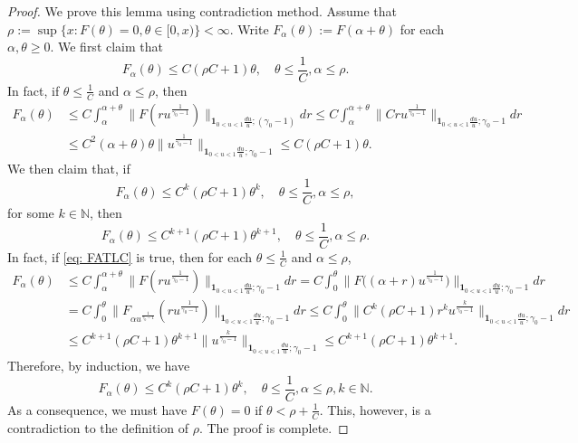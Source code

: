 \documentclass[12pt, a4paper]{amsart}
\theoremstyle{definition}
\numberwithin{equation}{section}
\begin{document}
\begin{proof}
We prove this lemma using contradiction method.
	Assume that $\rho :=  \sup\{x: F(\theta) = 0, \theta \in [0,x)\} < \infty$.
	Write $F_\alpha (\theta) := F(\alpha + \theta)$ for each $\alpha, \theta \geq 0$.
	We first claim that
\[
	F_\alpha (\theta)
	\leq C(\rho C + 1) \theta,
	\quad \theta \leq \frac{1}{C}, \alpha \leq \rho.
\]
	In fact, if $\theta \leq \frac{1}{C}$ and $\alpha \leq \rho$, then
\[\begin{split}
	F_\alpha (\theta)
	&\leq C\int_\alpha^{\alpha + \theta} \|F(ru^{\frac{1}{\gamma_0 - 1}}) \|_{\mathbf 1_{0<u<1}\frac{du}{u}; (\gamma_0 - 1)} dr
	\leq C\int_\alpha^{\alpha + \theta} \|Cru^{\frac{1}{\gamma_0 - 1}} \|_{\mathbf 1_{0<u<1}\frac{du}{u}; \gamma_0 - 1} dr
	\\&\leq C^2 (\alpha + \theta) \theta \|u^{\frac{1}{\gamma_0 - 1}} \|_{\mathbf 1_{0<u<1}\frac{du}{u}; \gamma_0 - 1}
	\leq C(\rho C + 1) \theta.
\end{split}\]
	We then claim that, if
\[\label{eq: FATLC}
	F_\alpha (\theta)
	\leq C^k(\rho C + 1) \theta^k,
	\quad \theta \leq \frac{1}{C}, \alpha \leq \rho,
\]
	for some $k \in \mathbb N$, then
\[
	F_\alpha (\theta)
	\leq C^{k+1}(\rho C + 1) \theta^{k+1},
	\quad \theta \leq \frac{1}{C}, \alpha \leq \rho.
	\]
	In fact, if \eqref{eq: FATLC} is true, then for each $\theta \leq \frac{1}{C}$ and $\alpha \leq \rho$,
\[\begin{split}
	F_\alpha (\theta)
	&\leq C\int_\alpha^{\alpha + \theta} \|F(ru^{\frac{1}{\gamma_0 - 1}}) \|_{\mathbf 1_{0<u<1}\frac{du}{u}; \gamma_0 - 1} dr
	=  C\int_0^\theta \big \|F\big( (\alpha + r)u^{\frac{1}{\gamma_0 - 1}} \big ) \big \|_{\mathbf 1_{0<u<1}\frac{du}{u}; \gamma_0 - 1} dr
	\\& =  C\int_0^\theta \|F_{\alpha u^{\frac{1}{\gamma_0 - 1}}}( ru^{\frac{1}{\gamma_0 - 1}}) \|_{\mathbf 1_{0<u<1}\frac{du}{u}; \gamma_0 - 1} dr
	\leq C\int_0^ \theta \|C^k (\rho C+ 1) r^k u^{\frac{k}{\gamma_0 - 1} } \|_{\mathbf 1_{0<u<1}\frac{du}{u}; \gamma_0 - 1} dr
	\\&\leq C^{k+1} (\rho C + 1) \theta^{k+1} \|u^{\frac{k}{\gamma_0 - 1} } \|_{\mathbf 1_{0<u<1}\frac{du}{u}; \gamma_0 - 1}
	\leq C^{k+1} (\rho C+1) \theta^{k+1} .
\end{split}\]
	Therefore, by induction, we have
\[
	F_\alpha (\theta)
	\leq C^k(\rho C + 1) \theta^k,
	\quad \theta \leq \frac{1}{C}, \alpha \leq \rho, k \in \mathbb N.
\]
	As a consequence, we must have $F(\theta) = 0$ if $\theta < \rho + \frac{1}{C}$.
	This, however, is a contradiction to the definition of $\rho$.
	The proof is complete.
\end{proof}
\end{document}
